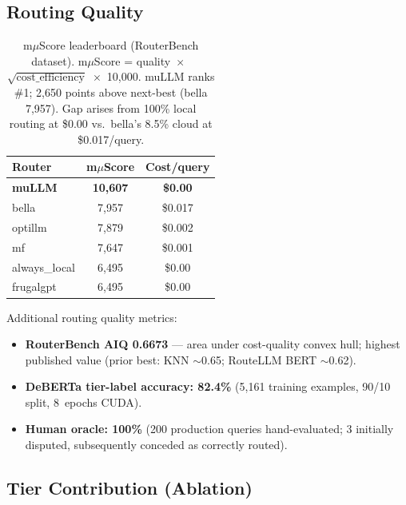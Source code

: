 \documentclass[11pt]{article}
\begin{document}
\subsection{Routing Quality}

\begin{table}[t]
\centering
\small
\begin{tabular}{lcc}
\toprule
\textbf{Router} & \textbf{m$\mu$Score} & \textbf{Cost/query} \\
\midrule
\textbf{muLLM} & \textbf{10,607} & \textbf{\$0.00} \\
bella & 7,957 & \$0.017 \\
optillm & 7,879 & \$0.002 \\
mf & 7,647 & \$0.001 \\
always\_local & 6,495 & \$0.00 \\
frugalgpt & 6,495 & \$0.00 \\
\bottomrule
\end{tabular}
\caption{m$\mu$Score leaderboard (RouterBench dataset). m$\mu$Score =
quality~$\times$~$\sqrt{\text{cost\_efficiency}}$~$\times$~10,000. muLLM
ranks \#1; 2,650 points above next-best (bella 7,957). Gap arises from
100\% local routing at \$0.00 vs.\ bella's 8.5\% cloud at
\$0.017/query.}
\label{tab:muscore}
\end{table}

Additional routing quality metrics:
\begin{itemize}
  \item \textbf{RouterBench AIQ 0.6673} --- area under cost-quality
    convex hull; highest published value (prior best: KNN $\sim$0.65;
    RouteLLM BERT $\sim$0.62).
  \item \textbf{DeBERTa tier-label accuracy: 82.4\%} (5,161 training
    examples, 90/10 split, 8~epochs CUDA).
  \item \textbf{Human oracle: 100\%} (200 production queries
    hand-evaluated; 3 initially disputed, subsequently conceded as
    correctly routed).
\end{itemize}

\subsection{Tier Contribution (Ablation)}
\end{document}
